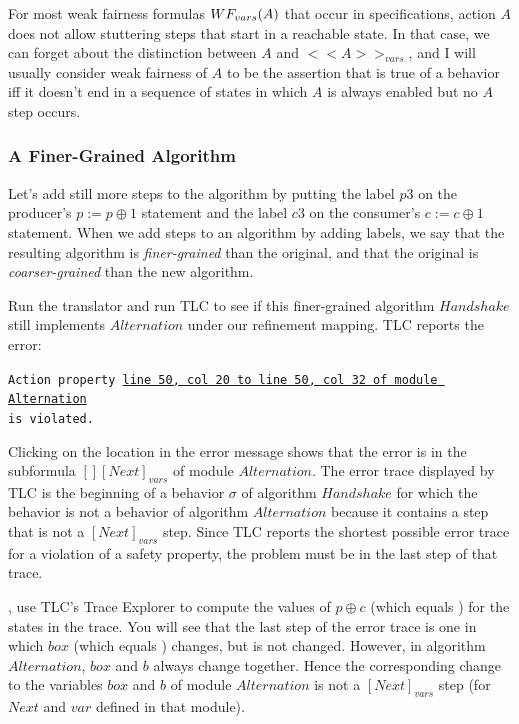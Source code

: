 \documentclass[fleqn,leqno]{article}
\begin{document}
For most weak fairness formulas $\WF_{vars}(A)$ that occur in
specifications, action $A$ does not allow stuttering steps that start
in a reachable state.  In that case, we can forget about the
distinction between $A$ and $<<A>>_{vars}$, and I will usually
consider weak fairness of $A$ to be the assertion that is true of a
behavior iff it doesn't end in a sequence of states in which $A$ is
always enabled but no $A$ step occurs.

\subsubsection{A Finer-Grained Algorithm}

Let's add still more steps to the algorithm by putting the label $p3$
on the producer's $p := p\oplus 1$ statement and the label
$c3$ on the consumer's $c := c\oplus 1$ statement.  When we add steps to
an algorithm by adding labels,
we say that the resulting algorithm is 
\emph{finer-grained} than the original, and that the original is
\emph{coarser-grained}
than the new algorithm.

Run the translator and run TLC to see if this finer-grained algorithm
$Handshake$ still implements $Alternation$ under our refinement mapping.
TLC reports the error:
\begin{widedisplay}
\tt Action property 
  {\darkaqua\underline{line 50, col 20 to line 50, 
       col 32 of module Alternation}} \\
is violated.
\end{widedisplay}
Clicking on the location in the error message shows that the error is
in the subformula $[][Next]_{vars}$ of module $Alternation$.  The
error trace displayed by TLC is the beginning of a behavior $\sigma$
of algorithm $Handshake$ for which the behavior \ov{\sigma} is not a
behavior of algorithm $Alternation$ because it contains a step that is
not a $[Next]_{vars}$ step.  Since TLC reports the shortest possible
error trace for a violation of a safety property, the problem must be
in the last step of that trace.


, use TLC's Trace Explorer
to compute the values of $p\oplus c$ (which equals ) for the
states in the trace.  You will see that the last step of the error
trace is one in which $box$ (which equals ) changes, but
 is not changed.  However, in algorithm $Alternation$, $box$ and
$b$ always change together.  Hence the corresponding change to the
variables $box$ and $b$ of module $Alternation$ is not a
$[Next]_{vars}$ step (for $Next$ and $var$ defined in that module).
\end{document}
